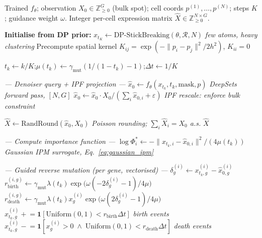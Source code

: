 \documentclass[11pt]{article}
\begin{document}
\begin{algorithm}[H]
\caption{Moran Bridge: Reverse Generation (checkpoint $\to$ per-cell profiles)}
\label{alg:gen}
\begin{algorithmic}[1]
\Require Trained $f_\theta$; observation $X_0 \in \mathbb{Z}_{\geq 0}^G$ (bulk spot); cell coords $p^{(1)},\ldots,p^{(N)}$; steps $K$; guidance weight $\omega$.
\Ensure Integer per-cell expression matrix $\hat{X} \in \mathbb{Z}_{\geq 0}^{N \times G}$.

\State \textbf{Initialise from DP prior:} $x_{t_K} \leftarrow \text{DP-StickBreaking}(\theta, \mathcal{R}, N)$
\hfill\textit{few atoms, heavy clustering}
\State Precompute spatial kernel $K_{ij} = \exp(-\|p_i - p_j\|^2 / 2h^2)$, $K_{ii} = 0$

  \State $t_k \leftarrow k/K$;\quad $\mu(t_k) \leftarrow \gamma_{\text{mut}}(1/(1{-}t_k) - 1)$;\quad $\Delta t \leftarrow 1/K$

  \Statex \hfill\textit{--- Denoiser query + IPF projection ---}
  \State $\hat{x}_0 \leftarrow f_\theta(x_{t_k}, t_k, \text{mask}, p)$
  \hfill\textit{DeepSets forward pass, $[N,G]$}
  \State $\hat{x}_0 \leftarrow \hat{x}_0 \cdot X_0 / (\sum_i \hat{x}_{0,i} + \varepsilon)$
  \hfill\textit{IPF rescale: enforce bulk constraint}

   
    \State $\hat{X} \leftarrow \text{RandRound}(\hat{x}_0, X_0)$
    \hfill\textit{Poisson rounding; $\sum_i \hat{X}_i = X_0$ a.s.}
    \State \Return $\hat{X}$
  \EndIf

  \Statex \hfill\textit{--- Compute importance function ---}
  \State $\log\Phi^*_i \leftarrow -\|x_{t_k,i} - \hat{x}_{0,i}\|^2 / (4\mu(t_k))$
  \hfill\textit{Gaussian IPM surrogate, Eq.~\ref{eq:gaussian_ipm}}

  \Statex \hfill\textit{--- Guided reverse mutation (per gene, vectorised) ---}
  \State $\delta_g^{(i)} \leftarrow x_{t_k,g}^{(i)} - \hat{x}_{0,g}^{(i)}$
  \State $r_{\text{birth}}^{(i,g)} \leftarrow \gamma_{\text{mut}}\lambda(t_k) \exp\!\bigl(\omega(-2\delta_g^{(i)}{-}1)/4\mu\bigr)$
  \State $r_{\text{death}}^{(i,g)} \leftarrow \gamma_{\text{mut}}\lambda(t_k) x_g^{(i)} \exp\!\bigl(\omega(2\delta_g^{(i)}{-}1)/4\mu\bigr)$
  \State $x_{t_k,g}^{(i)} \mathrel{+}= \mathbf{1}[\text{Uniform}(0,1) < r_{\text{birth}}\Delta t]$
  \hfill\textit{birth events}
  \State $x_{t_k,g}^{(i)} \mathrel{-}= \mathbf{1}[x_g^{(i)}>0 \;\wedge\; \text{Uniform}(0,1) < r_{\text{death}}\Delta t]$
  \hfill\textit{death events}


\end{algorithmic}
\end{algorithm}
\end{document}
